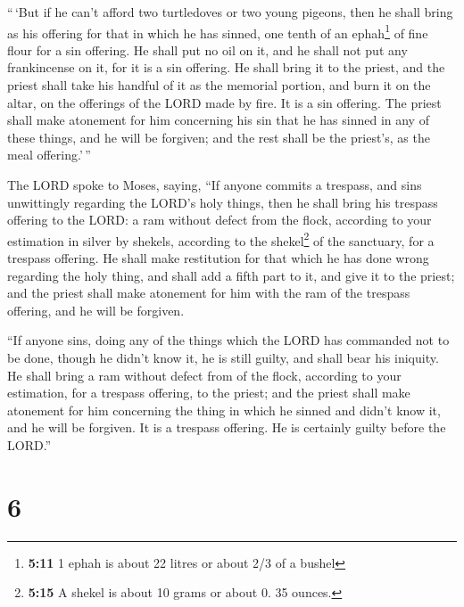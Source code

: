  ``\,`But if he can't afford two turtledoves or two young
pigeons, then he shall bring as his offering for that in which he has
sinned, one tenth of an ephah\footnote{\textbf{5:11} 1 ephah is about 22
  litres or about 2/3 of a bushel} of fine flour for a sin offering. He
shall put no oil on it, and he shall not put any frankincense on it, for
it is a sin offering.  He shall bring it to the priest,
and the priest shall take his handful of it as the memorial portion, and
burn it on the altar, on the offerings of the LORD made by fire. It is a
sin offering.  The priest shall make atonement for him
concerning his sin that he has sinned in any of these things, and he
will be forgiven; and the rest shall be the priest's, as the meal
offering.'\,''

 The LORD spoke to Moses, saying,  ``If
anyone commits a trespass, and sins unwittingly regarding the LORD's
holy things, then he shall bring his trespass offering to the LORD: a
ram without defect from the flock, according to your estimation in
silver by shekels, according to the shekel\footnote{\textbf{5:15} A
  shekel is about 10 grams or about 0. 35 ounces.} of the sanctuary, for
a trespass offering.  He shall make restitution for that
which he has done wrong regarding the holy thing, and shall add a fifth
part to it, and give it to the priest; and the priest shall make
atonement for him with the ram of the trespass offering, and he will be
forgiven.

 ``If anyone sins, doing any of the things which the LORD
has commanded not to be done, though he didn't know it, he is still
guilty, and shall bear his iniquity.  He shall bring a
ram without defect from of the flock, according to your estimation, for
a trespass offering, to the priest; and the priest shall make atonement
for him concerning the thing in which he sinned and didn't know it, and
he will be forgiven.  It is a trespass offering. He is
certainly guilty before the LORD.''

\hypertarget{section-5}{%
\section{6}\label{section-5}}

